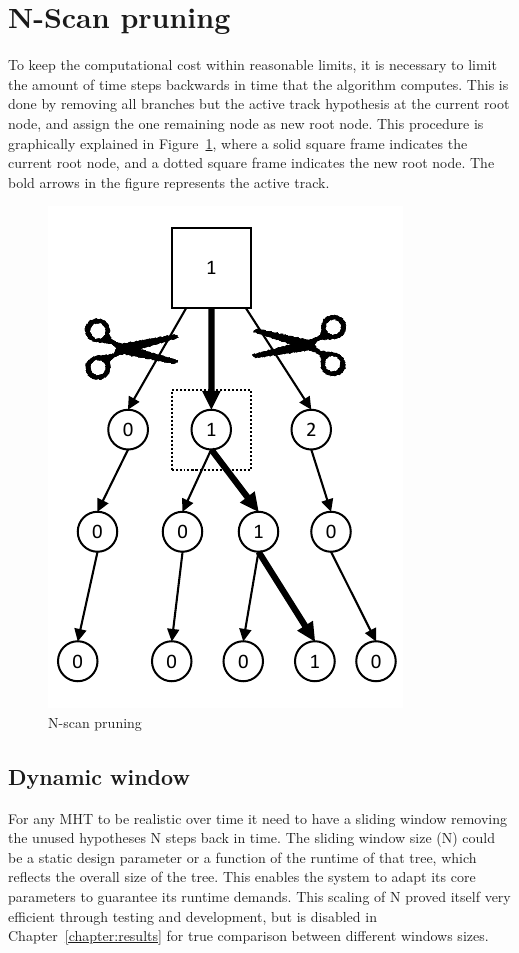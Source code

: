 \section{N-Scan pruning}
To keep the computational cost within reasonable limits, it is necessary to limit the amount of time steps backwards in time that the algorithm computes. This is done by removing all branches but the active track hypothesis at the current root node, and assign the one remaining node as new root node. This procedure is graphically explained in Figure~\ref{fig:pruned_tree}, where a solid square frame indicates the current root node, and a dotted square frame indicates the new root node. The bold arrows in the figure represents the active track.
\begin{figure}
\centering
\includegraphics[scale = .8]{Figures/Pruned-tree.pdf}
\caption{N-scan pruning}\label{fig:pruned_tree}
\end{figure}

\subsection{Dynamic window}
For any MHT to be realistic over time it need to have a sliding window removing the unused hypotheses N steps back in time. The sliding window size (N) could be a static design parameter or a function of the runtime of that tree, which reflects the overall size of the tree. This enables the system to adapt its core parameters to guarantee its runtime demands. This scaling of N proved itself very efficient through testing and development, but is disabled in Chapter~\ref{chapter:results} for true comparison between different windows sizes.

